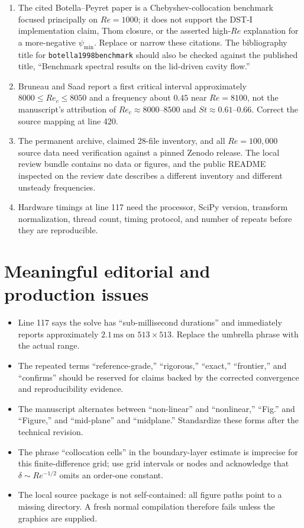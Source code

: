 \documentclass[11pt,a4paper]{article}
\begin{document}
\begin{enumerate}
  \item The cited Botella--Peyret paper is a Chebyshev-collocation benchmark focused principally on $Re=1000$; it does not support the DST-I implementation claim, Thom closure, or the asserted high-$Re$ explanation for a more-negative $\psi_{\min}$. Replace or narrow these citations. The bibliography title for \texttt{botella1998benchmark} should also be checked against the published title, ``Benchmark spectral results on the lid-driven cavity flow.''
  \item Bruneau and Saad report a first critical interval approximately $8000\le Re_c\le8050$ and a frequency about $0.45$ near $Re=8100$, not the manuscript's attribution of $Re_c\approx8000$--$8500$ and $St\approx0.61$--$0.66$. Correct the source mapping at line 420.
  \item The permanent archive, claimed 28-file inventory, and all $Re=100{,}000$ source data need verification against a pinned Zenodo release. The local review bundle contains no data or figures, and the public README inspected on the review date describes a different inventory and different unsteady frequencies.
  \item Hardware timings at line 117 need the processor, SciPy version, transform normalization, thread count, timing protocol, and number of repeats before they are reproducible.
\end{enumerate}

\section*{Meaningful editorial and production issues}

\begin{itemize}
  \item Line 117 says the solve has ``sub-millisecond durations'' and immediately reports approximately $2.1\,\mathrm{ms}$ on $513\times513$. Replace the umbrella phrase with the actual range.
  \item The repeated terms ``reference-grade,'' ``rigorous,'' ``exact,'' ``frontier,'' and ``confirms'' should be reserved for claims backed by the corrected convergence and reproducibility evidence.
  \item The manuscript alternates between ``non-linear'' and ``nonlinear,'' ``Fig.'' and ``Figure,'' and ``mid-plane'' and ``midplane.'' Standardize these forms after the technical revision.
  \item The phrase ``collocation cells'' in the boundary-layer estimate is imprecise for this finite-difference grid; use grid intervals or nodes and acknowledge that $\delta\sim Re^{-1/2}$ omits an order-one constant.
  \item The local source package is not self-contained: all figure paths point to a missing  directory. A fresh normal compilation therefore fails unless the graphics are supplied.
\end{itemize}
\end{document}
